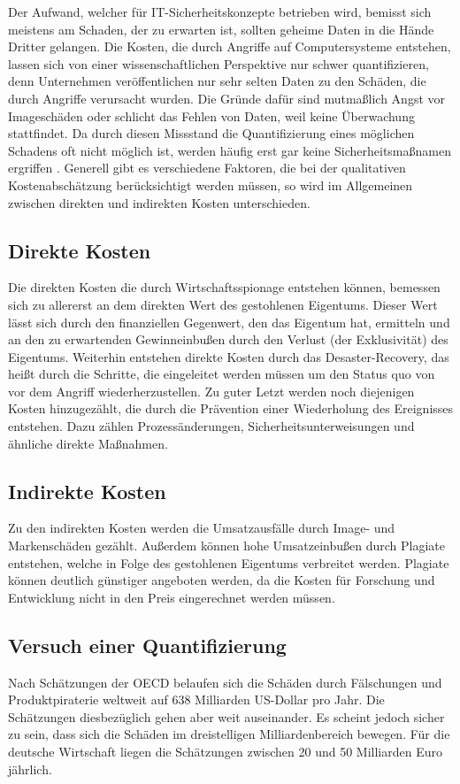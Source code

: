 \documentclass[
book,
a4paper,   
titlepage,  
halfparskip,
12pt        
]{scrartcl}
\begin{document}
\begin{onehalfspacing}
Der Aufwand, welcher für \ac{IT}-Sicherheitskonzepte betrieben wird, bemisst sich meistens am Schaden, der zu erwarten ist, sollten geheime Daten in die Hände Dritter gelangen. Die Kosten, die durch Angriffe auf Computersysteme entstehen, lassen sich von einer wissenschaftlichen Perspektive nur schwer quantifizieren, denn Unternehmen veröffentlichen nur sehr selten Daten zu den Schäden, die durch Angriffe verursacht wurden. Die Gründe dafür sind mutmaßlich Angst vor Imageschäden oder schlicht das Fehlen von Daten, weil keine Überwachung stattfindet. Da durch diesen Missstand die Quantifizierung eines möglichen Schadens oft nicht möglich ist, werden häufig erst gar keine Sicherheitsmaßnamen ergriffen \cite{spionage}. Generell gibt es verschiedene Faktoren, die bei der qualitativen Kostenabschätzung berücksichtigt werden müssen, so wird im Allgemeinen zwischen direkten und indirekten Kosten unterschieden.\cite[S. 12]{kosten}
\subsection{Direkte Kosten}
Die direkten Kosten die durch Wirtschaftsspionage entstehen können, bemessen sich zu allererst an dem direkten Wert des gestohlenen Eigentums. Dieser Wert lässt sich durch den finanziellen Gegenwert, den das Eigentum hat, ermitteln und an den zu erwartenden Gewinneinbußen durch den Verlust (der Exklusivität) des Eigentums. Weiterhin entstehen direkte Kosten durch das Desaster-Recovery, das heißt durch die Schritte, die eingeleitet werden müssen um den Status quo von vor dem Angriff wiederherzustellen. Zu guter Letzt werden noch diejenigen Kosten hinzugezählt, die durch die Prävention einer Wiederholung des Ereignisses entstehen. Dazu zählen Prozessänderungen, Sicherheitsunterweisungen und ähnliche direkte Maßnahmen.\cite[S. 13]{kosten}
\subsection{Indirekte Kosten}
Zu den indirekten Kosten werden die Umsatzausfälle durch Image- und Markenschäden gezählt. Außerdem können hohe Umsatzeinbußen durch Plagiate entstehen, welche in Folge des gestohlenen Eigentums verbreitet werden. Plagiate können deutlich günstiger angeboten werden, da die Kosten für Forschung und Entwicklung nicht in den Preis eingerechnet werden müssen.\cite[S. 14]{kosten}
\subsection{Versuch einer Quantifizierung}
Nach Schätzungen der \ac{OECD} belaufen sich die Schäden durch Fälschungen und Produktpiraterie weltweit auf 638 Milliarden US-Dollar pro Jahr. Die Schätzungen diesbezüglich gehen aber weit auseinander. Es scheint jedoch sicher zu sein, dass sich die Schäden im dreistelligen Milliardenbereich bewegen. Für die deutsche Wirtschaft liegen die Schätzungen zwischen 20 und 50 Milliarden Euro jährlich.\cite[S. 16f]{kosten}

\end{onehalfspacing}
\end{document}
